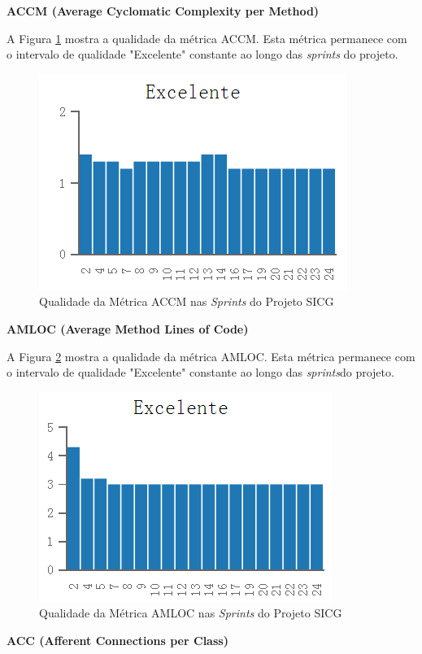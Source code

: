 \textbf{ACCM (Average Cyclomatic Complexity per Method)}

A Figura \ref{accm} mostra a qualidade da métrica ACCM. Esta métrica permanece com o intervalo de qualidade "Excelente" constante ao longo das \textit{sprints} do projeto.

\begin{figure}[H]
		\centering
			\includegraphics[scale=1.0]{figuras/accm.png}
		\caption{Qualidade da Métrica ACCM nas \textit{Sprints} do Projeto SICG}
		\label{accm}
\end{figure}

\textbf{AMLOC (Average Method Lines of Code)}

A Figura \ref{amloc} mostra a qualidade da métrica AMLOC. Esta métrica permanece com o intervalo de qualidade "Excelente" constante ao longo das \textit{sprints}do projeto.

\begin{figure}[H]
		\centering
			\includegraphics[scale=1.0]{figuras/amloc.png}
		\caption{Qualidade da Métrica AMLOC nas \textit{Sprints} do Projeto SICG}
		\label{amloc}
\end{figure}

\textbf{ACC (Afferent Connections per Class)}

